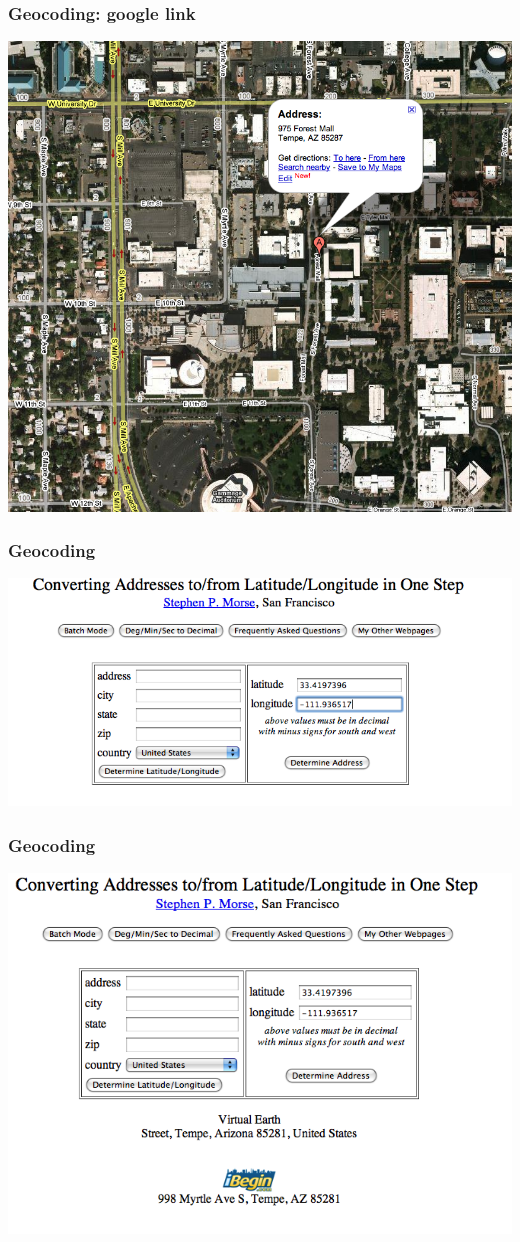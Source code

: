 \documentclass[nototal,handout]{beamer}
\begin{document}
\begin{frame}
	\frametitle{Geocoding: google link}
    \begin{center}
      \includegraphics[width=.65\linewidth]{geocode3.png}
    \end{center}
 \end{frame} 

\begin{frame}
	\frametitle{Geocoding}
    \begin{center}
      \includegraphics[width=.65\linewidth]{geocode4.png}
    \end{center}
 \end{frame} 

\begin{frame}
	\frametitle{Geocoding}
    \begin{center}
      \includegraphics[width=.65\linewidth]{geocode5.png}
    \end{center}
 \end{frame} 
\end{document}
